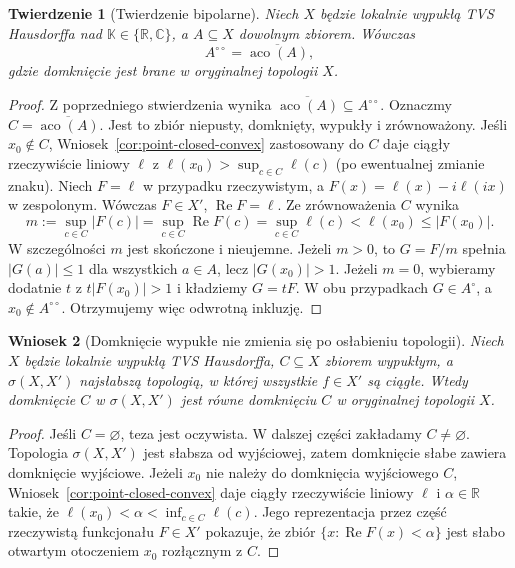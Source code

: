 \documentclass[11pt,a4paper]{article}
\numberwithin{equation}{section}
\theoremstyle{plain}
\newtheorem{twierdzenie}{Twierdzenie}[section]
\newtheorem{wniosek}[twierdzenie]{Wniosek}
\theoremstyle{definition}
\theoremstyle{remark}
\newcommand{\R}{\mathbb R}
\newcommand{\C}{\mathbb C}
\newcommand{\K}{\mathbb K}
\begin{document}
\begin{twierdzenie}[Twierdzenie bipolarne]\label{thm:bipolar}
Niech $X$ będzie lokalnie wypukłą TVS Hausdorffa nad
$\K\in\{\R,\C\}$, a $A\subseteq X$ dowolnym zbiorem.
Wówczas
\[
 A^{\circ\circ}=\overline{\operatorname{aco}(A)},
\]
gdzie domknięcie jest brane w oryginalnej topologii $X$.
\end{twierdzenie}
\begin{proof}
Z poprzedniego stwierdzenia wynika
$\overline{\operatorname{aco}(A)}\subseteq A^{\circ\circ}$.
Oznaczmy $C=\overline{\operatorname{aco}(A)}$.
Jest to zbiór niepusty, domknięty, wypukły i zrównoważony.
Jeśli $x_0\notin C$, Wniosek~\ref{cor:point-closed-convex}
zastosowany do $C$ daje ciągły rzeczywiście liniowy
$\ell$ z $\ell(x_0)>\sup_{c\in C}\ell(c)$
(po ewentualnej zmianie znaku).
Niech $F=\ell$ w przypadku rzeczywistym, a
$F(x)=\ell(x)-i\ell(ix)$ w zespolonym.
Wówczas $F\in X'$, $\operatorname{Re}F=\ell$.
Ze zrównoważenia $C$ wynika
\[
 m:=\sup_{c\in C}|F(c)|=\sup_{c\in C}\operatorname{Re}F(c)
 =\sup_{c\in C}\ell(c)<\ell(x_0)\le|F(x_0)|.
\]
W szczególności $m$ jest skończone i nieujemne.
Jeżeli $m>0$, to $G=F/m$ spełnia $|G(a)|\le1$
dla wszystkich $a\in A$, lecz $|G(x_0)|>1$.
Jeżeli $m=0$, wybieramy dodatnie $t$ z
$t|F(x_0)|>1$ i kładziemy $G=tF$.
W obu przypadkach $G\in A^\circ$, a $x_0\notin A^{\circ\circ}$.
Otrzymujemy więc odwrotną inkluzję.
\end{proof}

\begin{wniosek}[Domknięcie wypukłe nie zmienia się po osłabieniu topologii]
\label{cor:weak-convex-closure}
Niech $X$ będzie lokalnie wypukłą TVS Hausdorffa,
$C\subseteq X$ zbiorem wypukłym, a $\sigma(X,X')$
najsłabszą topologią, w której wszystkie $f\in X'$
są ciągłe. Wtedy domknięcie $C$ w $\sigma(X,X')$
jest równe domknięciu $C$ w oryginalnej topologii $X$.
\end{wniosek}
\begin{proof}
Jeśli $C=\varnothing$, teza jest oczywista. W dalszej części
zakładamy $C\ne\varnothing$. Topologia $\sigma(X,X')$ jest słabsza od wyjściowej,
zatem domknięcie słabe zawiera domknięcie wyjściowe.
Jeżeli $x_0$ nie należy do domknięcia wyjściowego
$C$, Wniosek~\ref{cor:point-closed-convex}
daje ciągły rzeczywiście liniowy $\ell$
i $\alpha\in\R$ takie, że
$\ell(x_0)<\alpha<\inf_{c\in C}\ell(c)$.
Jego reprezentacja przez część rzeczywistą funkcjonału
$F\in X'$ pokazuje, że zbiór
$\{x:\operatorname{Re}F(x)<\alpha\}$ jest słabo otwartym
otoczeniem $x_0$ rozłącznym z $C$.
\end{proof}
\end{document}

